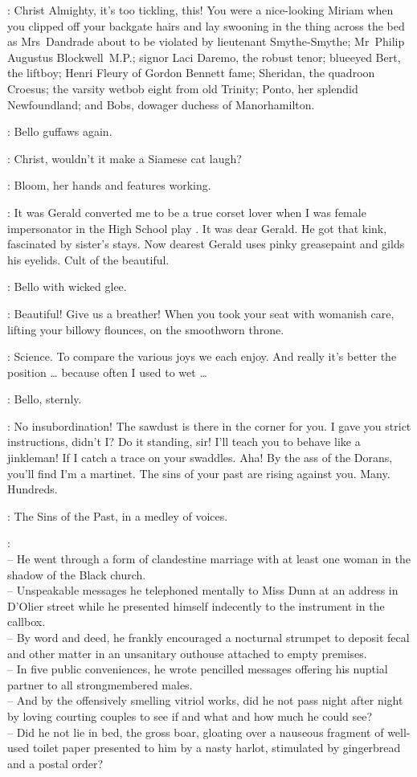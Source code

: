 \Bello:
Christ Almighty, it's too tickling, this!
You were a nice-looking Miriam when you clipped off your backgate hairs
and lay swooning in the thing across the bed as Mrs~Dandrade
about to be violated by lieutenant Smythe-Smythe; Mr~Philip Augustus Blockwell~M.P.;
signor Laci Daremo, the robust tenor; blueeyed Bert, the liftboy;
Henri Fleury of Gordon Bennett fame; Sheridan, the quadroon Croesus;
the varsity wetbob eight from old Trinity; Ponto, her splendid Newfoundland;
and Bobs, dowager duchess of Manorhamilton.

:
Bello guffaws again.

\Bello:
Christ, wouldn't it make a Siamese cat laugh?

:
Bloom, her hands and features working.

\Bloom:
It was Gerald converted me to be a true corset lover
when I was female impersonator in the High School play .
It was dear Gerald.
He got that kink, fascinated by sister's stays.
Now dearest Gerald uses pinky greasepaint and gilds his eyelids.
Cult of the beautiful.

:
Bello with wicked glee.

\Bello:
Beautiful!
Give us a breather!
When you took your seat with womanish care,
lifting your billowy flounces, on the smoothworn throne.

\Bloom:
Science.
To compare the various joys we each enjoy.
And really it's better the position \ldots
{}
because often I used to wet \ldots

:
Bello, sternly.

\Bello:
No insubordination!
The sawdust is there in the corner for you.
I gave you strict instructions, didn't I?
Do it standing, sir!
I'll teach you to behave like a jinkleman!
If I catch a trace on your swaddles.
Aha!
By the ass of the Dorans, you'll find I'm a martinet.
The sins of your past are rising against you.
Many. Hundreds.


:
The Sins of the Past, in a medley of voices.

\SinsPast:\\
-- He went through a form of clandestine marriage
with at least one woman in the shadow of the Black church.\\
-- Unspeakable messages he telephoned mentally to Miss Dunn
at an address in D'Olier street
while he presented himself indecently to the instrument in the callbox.\\
-- By word and deed, he frankly encouraged a nocturnal strumpet
to deposit fecal and other matter
in an unsanitary outhouse attached to empty premises.\\
-- In five public conveniences, he wrote pencilled messages
offering his nuptial partner to all strongmembered males.\\
-- And by the offensively smelling vitriol works,
did he not pass night after night
by loving courting couples
to see if and what and how much he could see?\\
-- Did he not lie in bed, the gross boar,
gloating over a nauseous fragment of well-used toilet paper
presented to him by a nasty harlot,
stimulated by gingerbread and a postal order?%

